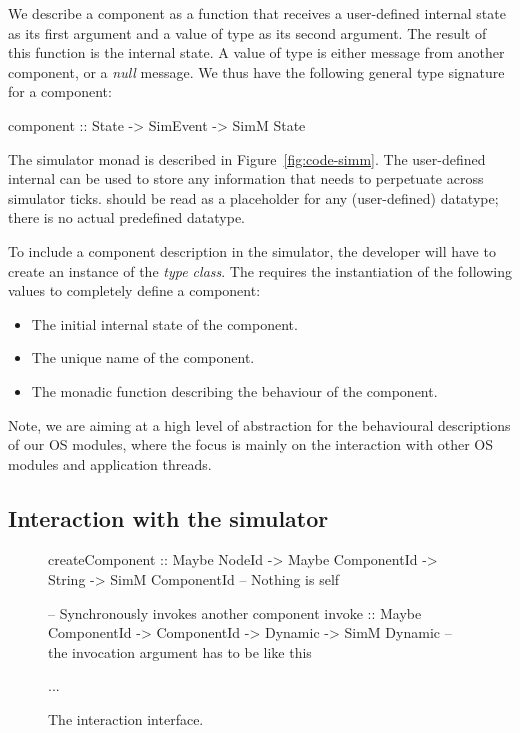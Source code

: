 We describe a component as a function that receives a user-defined internal state as its first argument and a value of type  as its second argument.
The result of this function is the internal state.
A value of type  is either message from another component, or a \emph{null} message.
We thus have the following general type signature for a component:
\begin{code}
component :: State -> SimEvent -> SimM State
\end{code}

The simulator monad  is described in Figure~\ref{fig:code-simm}. 
The user-defined internal  can be used to store any information that needs to perpetuate across simulator ticks.
 should be read as a placeholder for any (user-defined) datatype; there is no actual predefined  datatype.

To include a component description in the simulator, the developer will have to create an instance of the  \emph{type class}.
The  requires the instantiation of the following values to completely define a component:

\begin{itemize}
  \item The initial internal state of the component.
  \item The unique name of the component.
  \item The monadic function describing the behaviour of the component.
\end{itemize}

Note, we are aiming at a high level of abstraction for the behavioural descriptions of our OS modules, where the focus is mainly on the interaction with other OS modules and application threads.


\subsection{Interaction with the simulator}

\begin{figure*}
\centering
\begin{code}
createComponent :: Maybe NodeId -> Maybe ComponentId -> String -> SimM ComponentId   -- Nothing is self

-- Synchronously invokes another component
invoke :: Maybe ComponentId -> ComponentId -> Dynamic -> SimM Dynamic  -- the invocation argument has to be like this

...
\end{code}
\caption{The interaction interface.}
\label{fig:comp-types}
\end{figure*}

